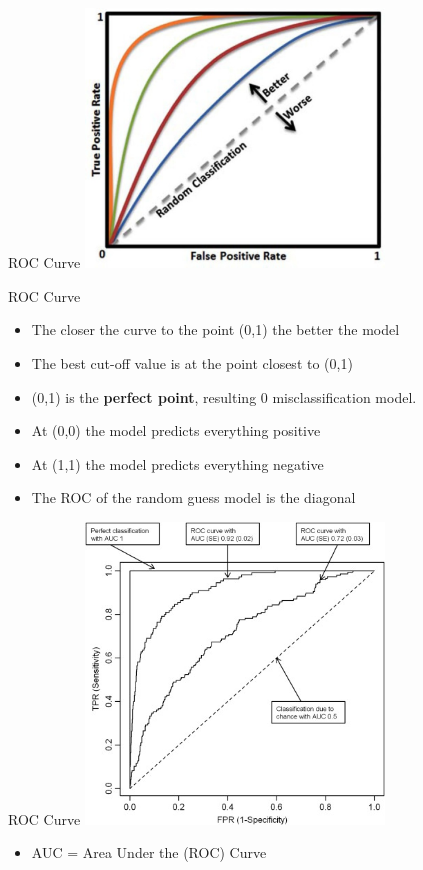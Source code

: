 \documentclass[
  ignorenonframetext,
]{beamer}
\providecommand{\tightlist}{%
  \setlength{\itemsep}{0pt}\setlength{\parskip}{0pt}}
\begin{document}
\begin{frame}{ROC Curve}
\protect\hypertarget{roc-curve-2}{}
\includegraphics[width=3.125in,height=\textheight]{images/roc2.png}
\end{frame}

\begin{frame}{ROC Curve}
\protect\hypertarget{roc-curve-3}{}
\begin{itemize}
\tightlist
\item
  The closer the curve to the point (0,1) the better the model
\item
  The best cut-off value is at the point closest to (0,1)
\item
  (0,1) is the \textbf{perfect point}, resulting 0 misclassification
  model.\\
\item
  At (0,0) the model predicts everything positive
\item
  At (1,1) the model predicts everything negative
\item
  The ROC of the random guess model is the diagonal
\end{itemize}
\end{frame}

\begin{frame}{ROC Curve}
\protect\hypertarget{roc-curve-4}{}
\includegraphics[width=3.125in,height=\textheight]{images/roc3.jpg}

\begin{itemize}
\tightlist
\item
  AUC = Area Under the (ROC) Curve
\end{itemize}
\end{frame}
\end{document}
